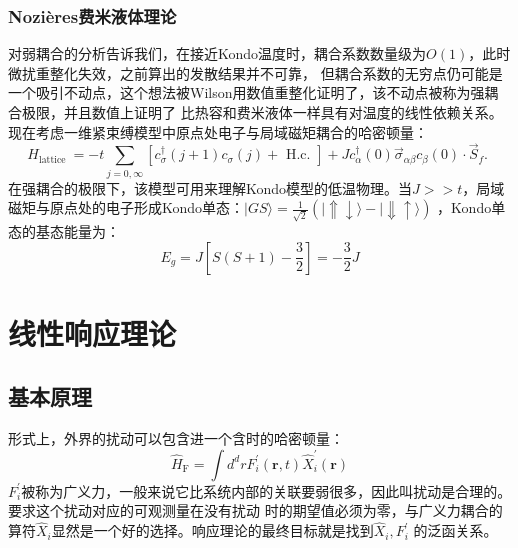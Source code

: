 \documentclass[10pt,openany]{book}
\theoremstyle{thmstyle} %
\theoremstyle{defstyle} %
\theoremstyle{prostyle} %
\begin{document}
\subsubsection*{Nozières费米液体理论}
对弱耦合的分析告诉我们，在接近Kondo温度时，耦合系数数量级为$ O(1) $，此时微扰重整化失效，之前算出的发散结果并不可靠，
但耦合系数的无穷点仍可能是一个吸引不动点，这个想法被Wilson用数值重整化证明了，该不动点被称为强耦合极限，并且数值上证明了
比热容和费米液体一样具有对温度的线性依赖关系。现在考虑一维紧束缚模型中原点处电子与局域磁矩耦合的哈密顿量：
\begin{equation}
	H_{\text {lattice }}=-t \sum_{j=0, \infty}\left[c_\sigma^{\dagger}(j+1) c_\sigma(j)+\text { H.c. }\right]+J c_\alpha^{\dagger}(0) \vec{\sigma}_{\alpha \beta} c_\beta(0) \cdot \vec{S}_f \text {. }
\end{equation}
在强耦合的极限下，该模型可用来理解Kondo模型的低温物理。当$ J>>t $，局域磁矩与原点处的电子形成Kondo单态：$ |G S\rangle=\frac{1}{\sqrt{2}}(|\Uparrow \downarrow\rangle-|\Downarrow \uparrow\rangle) $
，Kondo单态的基态能量为：
\begin{equation}
	E_g=J\left[S(S+1)-\frac{3}{2}\right]=-\frac{3}{2} J
\end{equation}  

\section{线性响应理论}
\subsection{基本原理}
形式上，外界的扰动可以包含进一个含时的哈密顿量：
\begin{equation}
  \hat{H}_{\mathrm{F}}=\int d^d r F_i^{\prime}(\mathbf{r}, t) \hat{X}_i^{\prime}(\mathbf{r})
\end{equation}
$ F_i^{\prime} $被称为广义力，一般来说它比系统内部的关联要弱很多，因此叫扰动是合理的。要求这个扰动对应的可观测量在没有扰动
时的期望值必须为零，与广义力耦合的算符$ \hat{X}_i $显然是一个好的选择。响应理论的最终目标就是找到$ \hat{X}_i,F_i^{\prime} $
的泛函关系。\\
\end{document}
